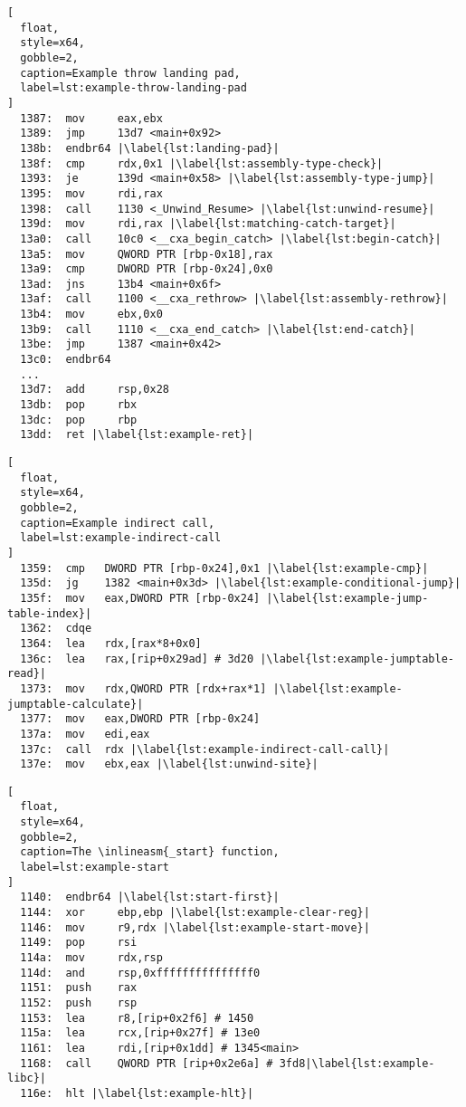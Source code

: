 \begin{lstlisting}[
  float,
  style=x64,
  gobble=2,
  caption=Example throw landing pad,
  label=lst:example-throw-landing-pad
]
  1387:  mov     eax,ebx
  1389:  jmp     13d7 <main+0x92>
  138b:  endbr64 |\label{lst:landing-pad}|
  138f:  cmp     rdx,0x1 |\label{lst:assembly-type-check}|
  1393:  je      139d <main+0x58> |\label{lst:assembly-type-jump}|
  1395:  mov     rdi,rax
  1398:  call    1130 <_Unwind_Resume> |\label{lst:unwind-resume}|
  139d:  mov     rdi,rax |\label{lst:matching-catch-target}|
  13a0:  call    10c0 <__cxa_begin_catch> |\label{lst:begin-catch}|
  13a5:  mov     QWORD PTR [rbp-0x18],rax
  13a9:  cmp     DWORD PTR [rbp-0x24],0x0
  13ad:  jns     13b4 <main+0x6f>
  13af:  call    1100 <__cxa_rethrow> |\label{lst:assembly-rethrow}|
  13b4:  mov     ebx,0x0
  13b9:  call    1110 <__cxa_end_catch> |\label{lst:end-catch}|
  13be:  jmp     1387 <main+0x42>
  13c0:  endbr64
  ...
  13d7:  add     rsp,0x28
  13db:  pop     rbx
  13dc:  pop     rbp
  13dd:  ret |\label{lst:example-ret}|
\end{lstlisting}
\begin{lstlisting}[
  float,
  style=x64,
  gobble=2,
  caption=Example indirect call,
  label=lst:example-indirect-call
]
  1359:  cmp   DWORD PTR [rbp-0x24],0x1 |\label{lst:example-cmp}|
  135d:  jg    1382 <main+0x3d> |\label{lst:example-conditional-jump}|
  135f:  mov   eax,DWORD PTR [rbp-0x24] |\label{lst:example-jump-table-index}|
  1362:  cdqe
  1364:  lea   rdx,[rax*8+0x0]
  136c:  lea   rax,[rip+0x29ad] # 3d20 |\label{lst:example-jumptable-read}|
  1373:  mov   rdx,QWORD PTR [rdx+rax*1] |\label{lst:example-jumptable-calculate}|
  1377:  mov   eax,DWORD PTR [rbp-0x24]
  137a:  mov   edi,eax
  137c:  call  rdx |\label{lst:example-indirect-call-call}|
  137e:  mov   ebx,eax |\label{lst:unwind-site}|
\end{lstlisting}
\begin{lstlisting}[
  float,
  style=x64,
  gobble=2,
  caption=The \inlineasm{_start} function,
  label=lst:example-start
]
  1140:  endbr64 |\label{lst:start-first}|
  1144:  xor     ebp,ebp |\label{lst:example-clear-reg}|
  1146:  mov     r9,rdx |\label{lst:example-start-move}|
  1149:  pop     rsi
  114a:  mov     rdx,rsp
  114d:  and     rsp,0xfffffffffffffff0
  1151:  push    rax
  1152:  push    rsp
  1153:  lea     r8,[rip+0x2f6] # 1450
  115a:  lea     rcx,[rip+0x27f] # 13e0
  1161:  lea     rdi,[rip+0x1dd] # 1345<main>
  1168:  call    QWORD PTR [rip+0x2e6a] # 3fd8|\label{lst:example-libc}|
  116e:  hlt |\label{lst:example-hlt}|
\end{lstlisting}
